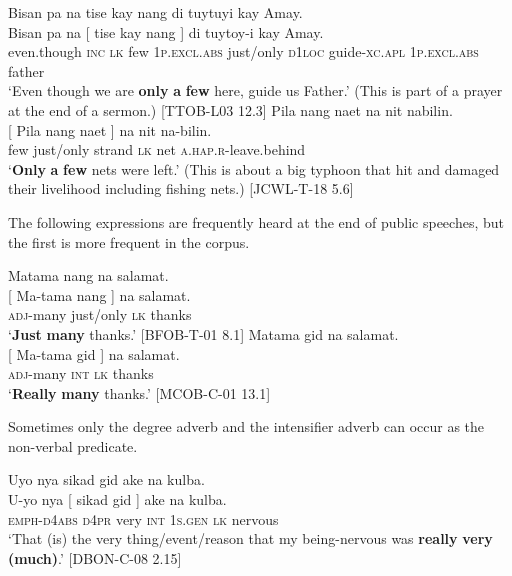 \ea
Bisan  pa  na  tise  kay  nang di tuytuyi kay Amay. \\\smallskip
 \gll Bisan  pa  na  [ tise  kay  nang ]  di tuytoy-i kay Amay. \\
even.though  \textsc{inc}  \textsc{lk} {} few  1\textsc{p.excl.abs}  just/only {} \textsc{d}1\textsc{loc} guide-\textsc{xc.apl}  1\textsc{p.excl.abs}  father \\
\glt `Even though we are \textbf{only} \textbf{a} \textbf{few} here, guide us Father.’ (This is part of a prayer at the end of a sermon.) [TTOB-L03 12.3]
\z
\ea
Pila  nang  naet na  nit  nabilin. \\\smallskip
 \gll {}[ Pila  nang  naet ]  na  nit  na-bilin. \\
{} few  just/only  strand {} \textsc{lk}  net  \textsc{a.hap.r}-leave.behind \\
\glt ‘\textbf{Only} \textbf{a} \textbf{few} nets were left.’ (This is about a big typhoon that hit and damaged their livelihood including fishing nets.) [JCWL-T-18 5.6]
\z

The following expressions are frequently heard at the end of public speeches, but the first is more frequent in the corpus.

\ea
Matama  nang  na  salamat. \\\smallskip
 \gll {}[ Ma-tama  nang ]  na  salamat. \\
{} \textsc{adj}-many  just/only {} \textsc{lk}  thanks \\
\glt ‘\textbf{Just} \textbf{many} thanks.’ [BFOB-T-01 8.1]
\z
\ea
Matama  gid  na  salamat.\\\smallskip
\gll {}[ Ma-tama  gid ]  na  salamat. \\
{} \textsc{adj}-many  \textsc{int} {} \textsc{lk}  thanks \\
\glt ‘\textbf{Really} \textbf{many} thanks.’ [MCOB-C-01 13.1]
\z

Sometimes only the degree adverb and the intensifier adverb can occur as the non-verbal predicate.

\ea
Uyo nya  sikad  gid  ake  na  kulba. \\\smallskip
 \gll U-yo nya  [ sikad  gid ]  ake  na  kulba. \\
\textsc{emph}-\textsc{d4abs}  \textsc{d4pr} {} very  \textsc{int} {} 1\textsc{s.gen}  \textsc{lk}  nervous \\
\glt ‘That (is) the very thing/event/reason that my being-nervous was \textbf{really} \textbf{very} \textbf{(much)}.’ [DBON-C-08 2.15]
\z


